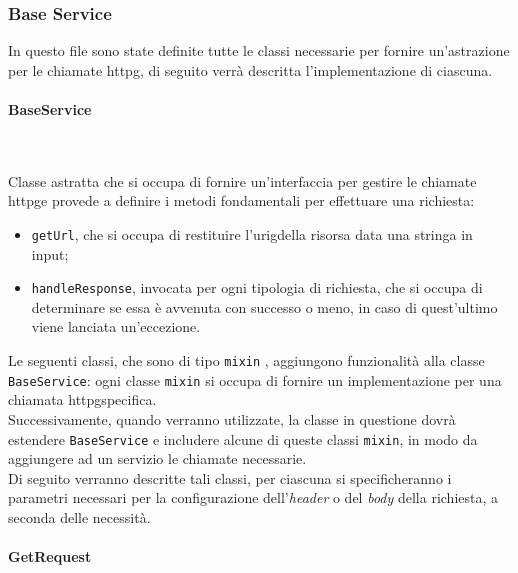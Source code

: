 \subsubsection*{Base Service}
\label{subsubsec:base-service}

In questo file sono state definite tutte le classi necessarie per fornire un'astrazione per le chiamate \gls{httpg}\glsoccur, di seguito verrà descritta l'implementazione di ciascuna.

\paragraph*{BaseService} ~ \\
\label{par:base-service}

\noindent Classe astratta che si occupa di fornire un'interfaccia per gestire le chiamate \gls{httpg}\glsoccur e provede a definire i metodi fondamentali per effettuare una richiesta:
\begin{itemize}
    \item \lstinline{getUrl}, che si occupa di restituire l'\gls{urig}\glsoccur della risorsa data una stringa in input;
    \item \lstinline{handleResponse}, invocata per ogni tipologia di richiesta, che si occupa di determinare se essa è avvenuta con successo o meno, in caso di quest'ultimo viene lanciata un'eccezione.
\end{itemize}
Le seguenti classi, che sono di tipo \lstinline{mixin} \cite{site:mixins}, aggiungono funzionalità alla classe \lstinline{BaseService}: ogni classe \lstinline{mixin} si occupa di fornire un implementazione per una chiamata \gls{httpg}\glsoccur specifica. \\
Successivamente, quando verranno utilizzate, la classe in questione dovrà estendere \lstinline{BaseService} e includere alcune di queste classi \lstinline{mixin}, in modo da aggiungere ad un servizio le chiamate necessarie.\\
Di seguito verranno descritte tali classi, per ciascuna si specificheranno i parametri necessari per la configurazione dell'\emph{header} o del \emph{body} della richiesta, a seconda delle necessità. \\

\paragraph*{GetRequest} ~ \\
\label{par:get-request}

